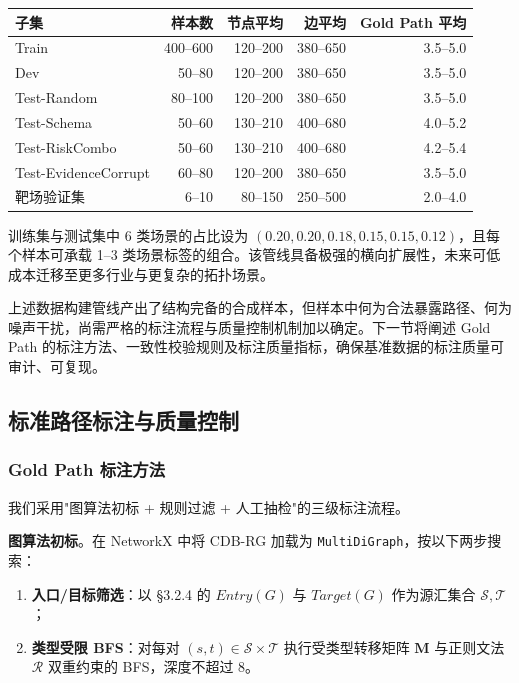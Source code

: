\documentclass[a4paper,12pt]{ctexart}
\begin{document}
\begin{table}[htbp]
\centering
\small
\setlength{\tabcolsep}{4pt}
\begin{tabular}{|l|r|r|r|r|}
\hline
\textbf{子集} & \textbf{样本数} & \textbf{节点平均} & \textbf{边平均} & \textbf{Gold Path 平均} \\
\hline
Train & 400–600 & 120–200 & 380–650 & 3.5–5.0 \\
\hline
Dev & 50–80 & 120–200 & 380–650 & 3.5–5.0 \\
\hline
Test-Random & 80–100 & 120–200 & 380–650 & 3.5–5.0 \\
\hline
Test-Schema & 50–60 & 130–210 & 400–680 & 4.0–5.2 \\
\hline
Test-RiskCombo & 50–60 & 130–210 & 400–680 & 4.2–5.4 \\
\hline
Test-EvidenceCorrupt & 60–80 & 120–200 & 380–650 & 3.5–5.0 \\
\hline
靶场验证集 & 6–10 & 80–150 & 250–500 & 2.0–4.0 \\
\hline
\end{tabular}
\end{table}

训练集与测试集中 6 类场景的占比设为 $(0.20, 0.20, 0.18, 0.15, 0.15, 0.12)$，且每个样本可承载 1–3 类场景标签的组合。该管线具备极强的横向扩展性，未来可低成本迁移至更多行业与更复杂的拓扑场景。

上述数据构建管线产出了结构完备的合成样本，但样本中何为合法暴露路径、何为噪声干扰，尚需严格的标注流程与质量控制机制加以确定。下一节将阐述 Gold Path 的标注方法、一致性校验规则及标注质量指标，确保基准数据的标注质量可审计、可复现。

\subsection{标准路径标注与质量控制}

\subsubsection{Gold Path 标注方法}

我们采用"图算法初标 + 规则过滤 + 人工抽检"的三级标注流程。

\textbf{图算法初标}。在 NetworkX 中将 CDB-RG 加载为 \texttt{MultiDiGraph}，按以下两步搜索：

\begin{enumerate}[leftmargin=*]
\item \textbf{入口/目标筛选}：以 §3.2.4 的 $Entry(G)$ 与 $Target(G)$ 作为源汇集合 $\mathcal{S}, \mathcal{T}$；
\item \textbf{类型受限 BFS}：对每对 $(s, t) \in \mathcal{S} \times \mathcal{T}$ 执行受类型转移矩阵 $\mathbf{M}$ 与正则文法 $\mathcal{R}$ 双重约束的 BFS，深度不超过 8。
\end{enumerate}
\end{document}
